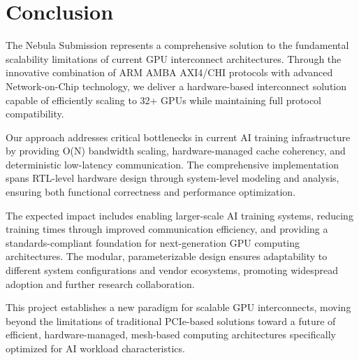 \documentclass[11pt,a4paper]{article}
\begin{document}
\section{Conclusion}

The Nebula Submission represents a comprehensive solution to the fundamental scalability limitations of current GPU interconnect architectures. Through the innovative combination of ARM AMBA AXI4/CHI protocols with advanced Network-on-Chip technology, we deliver a hardware-based interconnect solution capable of efficiently scaling to 32+ GPUs while maintaining full protocol compatibility.

Our approach addresses critical bottlenecks in current AI training infrastructure by providing O(N) bandwidth scaling, hardware-managed cache coherency, and deterministic low-latency communication. The comprehensive implementation spans RTL-level hardware design through system-level modeling and analysis, ensuring both functional correctness and performance optimization.

The expected impact includes enabling larger-scale AI training systems, reducing training times through improved communication efficiency, and providing a standards-compliant foundation for next-generation GPU computing architectures. The modular, parameterizable design ensures adaptability to different system configurations and vendor ecosystems, promoting widespread adoption and further research collaboration.

This project establishes a new paradigm for scalable GPU interconnects, moving beyond the limitations of traditional PCIe-based solutions toward a future of efficient, hardware-managed, mesh-based computing architectures specifically optimized for AI workload characteristics.
\end{document}

